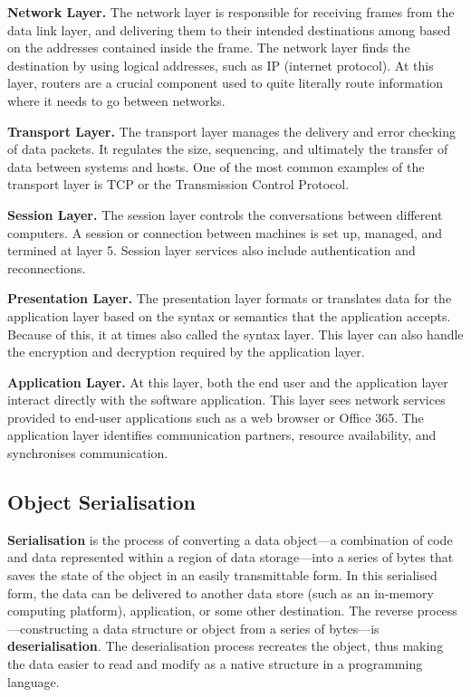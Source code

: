 \documentclass[../report.tex]{subfiles}
\begin{document}
\textbf{Network Layer.} The network layer is responsible for receiving frames from the data link layer, and delivering them to their intended destinations among based on the addresses contained inside the frame. The network layer finds the destination by using logical addresses, such as IP (internet protocol). At this layer, routers are a crucial component used to quite literally route information where it needs to go between networks.

\textbf{Transport Layer.} The transport layer manages the delivery and error checking of data packets. It regulates the size, sequencing, and ultimately the transfer of data between systems and hosts. One of the most common examples of the transport layer is TCP or the Transmission Control Protocol.

\textbf{Session Layer.} The session layer controls the conversations between different computers. A session or connection between machines is set up, managed, and termined at layer 5. Session layer services also include authentication and reconnections.

\textbf{Presentation Layer.} The presentation layer formats or translates data for the application layer based on the syntax or semantics that the application accepts. Because of this, it at times also called the syntax layer. This layer can also handle the encryption and decryption required by the application layer.

\textbf{Application Layer.} At this layer, both the end user and the application layer interact directly with the software application. This layer sees network services provided to end-user applications such as a web browser or Office 365. The application layer identifies communication partners, resource availability, and synchronises communication.


\subsection{Object Serialisation} %

\textbf{Serialisation} is the process of converting a data object—a combination of code and data represented within a region of data storage—into a series of bytes that saves the state of the object in an easily transmittable form. In this serialised form, the data can be delivered to another data store (such as an in-memory computing platform), application, or some other destination. The reverse process—constructing a data structure or object from a series of bytes—is \textbf{deserialisation}. The deserialisation process recreates the object, thus making the data easier to read and modify as a native structure in a programming language.
\end{document}
